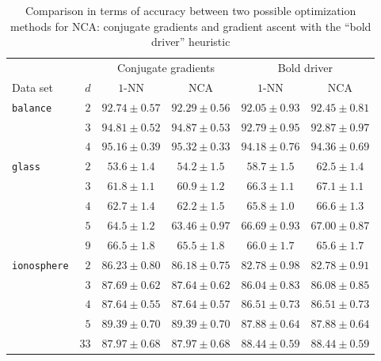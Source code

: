 \begin{landscape}
  \begin{table}
    \centering\begin{tabular}{lrcccc}
      \toprule
      &     & \multicolumn{2}{c}{Conjugate gradients}  & \multicolumn{2}{c}{Bold driver}\\
      \cmidrule(r){3-4} \cmidrule(r){5-6}
      Data set & $d$ & $1$-NN & NCA & $1$-NN & NCA \\
      \midrule
	\texttt{balance}&$2$&$92.74 \pm 0.57$&$92.29 \pm 0.56$&$92.05 \pm 0.93$&$92.45 \pm 0.81$\\ 
	&$3$&$94.81 \pm 0.52$&$94.87 \pm 0.53$&$92.79 \pm 0.95$&$92.87 \pm 0.97$\\ 
	&$4$&$95.16 \pm 0.39$&$95.32 \pm 0.33$&$94.18 \pm 0.76$&$94.36 \pm 0.69$\\ 
	\midrule
	\texttt{glass}&$2$&$53.6 \pm 1.4$&$54.2 \pm 1.5$&$58.7 \pm 1.5$&$62.5 \pm 1.4$\\ 
	&$3$&$61.8 \pm 1.1$&$60.9 \pm 1.2$&$66.3 \pm 1.1$&$67.1 \pm 1.1$\\ 
	&$4$&$62.7 \pm 1.4$&$62.2 \pm 1.5$&$65.8 \pm 1.0$&$66.6 \pm 1.3$\\ 
	&$5$&$64.5 \pm 1.2$&$63.46 \pm 0.97$&$66.69 \pm 0.93$&$67.00 \pm 0.87$\\ 
	&$9$&$66.5 \pm 1.8$&$65.5 \pm 1.8$&$66.0 \pm 1.7$&$65.6 \pm 1.7$\\ 
	\midrule
	\texttt{ionosphere}&$2$&$86.23 \pm 0.80$&$86.18 \pm 0.75$&$82.78 \pm 0.98$&$82.78 \pm 0.91$\\ 
	&$3$&$87.69 \pm 0.62$&$87.64 \pm 0.62$&$86.04 \pm 0.83$&$86.08 \pm 0.85$\\ 
	&$4$&$87.64 \pm 0.55$&$87.64 \pm 0.57$&$86.51 \pm 0.73$&$86.51 \pm 0.73$\\ 
	&$5$&$89.39 \pm 0.70$&$89.39 \pm 0.70$&$87.88 \pm 0.64$&$87.88 \pm 0.64$\\ 
	&$33$&$87.97 \pm 0.68$&$87.97 \pm 0.68$&$88.44 \pm 0.59$&$88.44 \pm 0.59$\\ 
      \bottomrule
    \end{tabular}
  \caption{Comparison in terms of accuracy between two possible optimization methods for NCA: conjugate gradients and gradient ascent with the ``bold driver'' heuristic}
  \label{table:comp-opts-1}
  \end{table}


\end{landscape}
